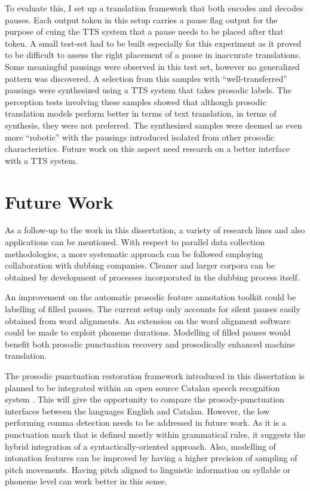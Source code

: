To evaluate this, I set up a translation framework that both encodes and decodes pauses. Each output token in this setup carries a pause flag output for the purpose of cuing the TTS system that a pause needs to be placed after that token. A small test-set had to be built especially for this experiment as it proved to be difficult to assess the right placement of a pause in inaccurate translations. Some meaningful pausings were observed in this test set, however no generalized pattern was discovered. A selection from this samples with ``well-transferred'' pausings were synthesized using a TTS system that takes prosodic labels. The perception tests involving these samples showed that although prosodic translation models perform better in terms of text translation, in terms of synthesis, they were not preferred. The synthesized samples were deemed as even more ``robotic'' with the pausings introduced isolated from other prosodic characteristics. Future work on this aspect need research on a better interface with a TTS system. 

\section{Future Work}
\label{conclusions:future}

As a follow-up to the work in this dissertation, a variety of research lines and also applications can be mentioned. With respect to parallel data collection methodologies, a more systematic approach can be followed employing collaboration with dubbing companies. Cleaner and larger corpora can be obtained by development of processes incorporated in the dubbing process itself. 

An improvement on the automatic prosodic feature annotation toolkit could be labelling of filled pauses. The current setup only accounts for silent pauses easily obtained from word alignments. An extension on the word alignment software could be made to exploit phoneme durations. Modelling of filled pauses would benefit both prosodic punctuation recovery and prosodically enhanced machine translation. 

The prosodic punctuation restoration framework introduced in this dissertation is planned to be integrated within an open source Catalan speech recognition system \citep{Kulebi2018}. This will give the opportunity to compare the prosody-punctuation interfaces between the languages English and Catalan. However, the low performing comma detection needs to be addressed in future work. As it is a punctuation mark that is defined mostly within grammatical rules, it suggests the hybrid integration of a syntactically-oriented approach. Also, modelling of intonation features can be improved by having a higher precision of sampling of pitch movements. Having pitch aligned to linguistic information on syllable or phoneme level can work better in this sense. 


